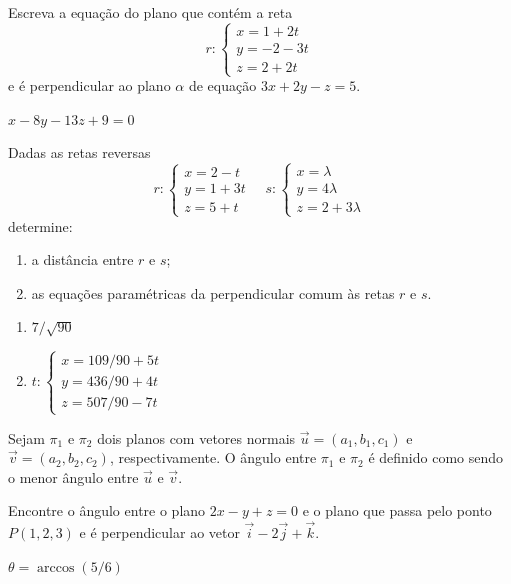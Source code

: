 \documentclass[12pt]{exam}
\begin{document}
\begin{exercicio}
    Escreva a equação do plano que contém a reta
    \[
        r : \begin{cases}
            x = 1 + 2t \\
            y = -2 -3t \\
            z = 2 + 2t
        \end{cases}
    \]
    e é perpendicular ao plano $\alpha$ de equação $3x + 2y - z = 5$.
    \begin{solucao}
        $x - 8y - 13z + 9 = 0$
    \end{solucao}
\end{exercicio}

\begin{exercicio}
    Dadas as retas reversas
    \[
        r : \begin{cases}
            x = 2 - t  \\
            y = 1 + 3t \\
            z = 5 + t
        \end{cases} \quad s : \begin{cases}
            x = \lambda  \\
            y = 4\lambda \\
            z = 2 + 3\lambda
        \end{cases}
    \]
    determine:
    \begin{enumerate}[label=({\alph*})]
        \item a distância entre $r$ e $s$;
        \item as equações paramétricas da perpendicular comum às retas $r$ e $s$.
    \end{enumerate}
    \begin{solucao}
        \begin{enumerate}[label=({\alph*})]
            \item $7/\sqrt{90}$
            \item $t : \begin{cases}
                          x = 109/90 + 5t \\
                          y = 436/90 + 4t \\
                          z = 507/90 - 7t
                      \end{cases}$
        \end{enumerate}
    \end{solucao}
\end{exercicio}

Sejam $\pi_1$ e $\pi_2$ dois planos com vetores normais $\vec{u} = (a_1,b_1,c_1)$ e $\vec{v} = (a_2,b_2,c_2)$, respectivamente. O ângulo entre $\pi_1$ e $\pi_2$ é definido como sendo o menor ângulo entre $\vec{u}$ e $\vec{v}$.
\begin{exercicio}
    Encontre o ângulo entre o plano $2x - y + z = 0$ e o plano que passa pelo ponto $P(1,2,3)$ e é perpendicular ao vetor $\vec{i} - 2\vec{j} + \vec{k}$.
    \begin{solucao}
        $\theta = \arccos(5/6)$
    \end{solucao}
\end{exercicio}
\end{document}
